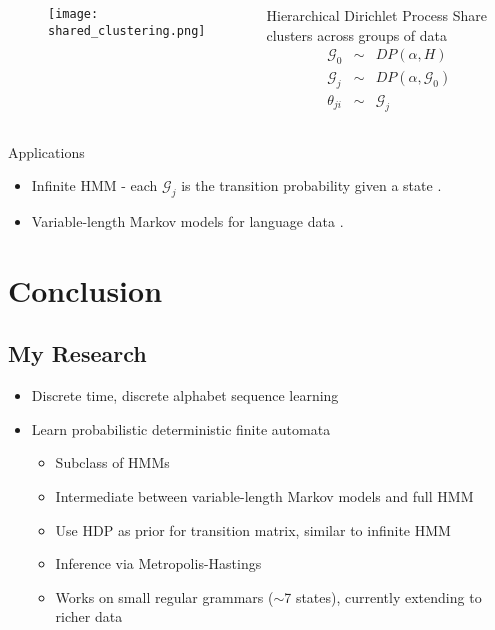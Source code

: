 \documentclass{beamer}
\begin{document}
\begin{frame}
\begin{columns}[top]
\begin{center}
		\begin{figure}
		\texttt{[image: shared\_clustering.png]}
	\end{figure}
\end{center}
\begin{block}{Hierarchical Dirichlet Process}
Share clusters across groups of data
\begin{eqnarray*}
\mathcal{G}_0  & \sim & DP(\alpha,H) \\
\mathcal{G}_j & \sim & DP(\alpha,\mathcal{G}_0) \\
\theta_{ji} & \sim & \mathcal{G}_j
\end{eqnarray*}
\end{block}
\end{columns}
\begin{block}{Applications}
\begin{itemize}
\item{Infinite HMM - each $\mathcal{G}_j$ is the transition probability given a state \citep{Teh2006b}.}
\item{Variable-length Markov models for language data \citep{Teh2006a}.}
\end{itemize}
\end{block}
\end{frame}

\section{Conclusion}

\subsection{My Research}
\begin{frame}
\begin{itemize}
\item{Discrete time, discrete alphabet sequence learning}
\item{Learn probabilistic deterministic finite automata}
\begin{itemize}
	\item{Subclass of HMMs}
	\item{Intermediate between variable-length Markov models and full HMM}
	\item{Use HDP as prior for transition matrix, similar to infinite HMM}
	\item{Inference via Metropolis-Hastings}
	\item{Works on small regular grammars ($\sim$7 states), currently extending to richer data}
\end{itemize}
\end{itemize}
\end{frame}
\end{document}
